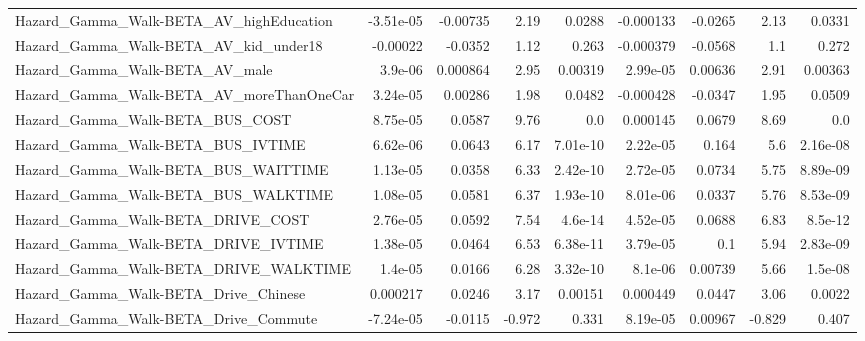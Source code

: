 \begin{tabular}{lrrrrrrrr}
Hazard\_Gamma\_Walk-BETA\_AV\_highEducation            &   -3.51e-05 &     -0.00735 &     2.19 &   0.0288 &  -0.000133 &     -0.0265 &         2.13 &        0.0331 \\
Hazard\_Gamma\_Walk-BETA\_AV\_kid\_under18              &    -0.00022 &      -0.0352 &     1.12 &    0.263 &  -0.000379 &     -0.0568 &          1.1 &         0.272 \\
Hazard\_Gamma\_Walk-BETA\_AV\_male                     &     3.9e-06 &     0.000864 &     2.95 &  0.00319 &   2.99e-05 &     0.00636 &         2.91 &       0.00363 \\
Hazard\_Gamma\_Walk-BETA\_AV\_moreThanOneCar           &    3.24e-05 &      0.00286 &     1.98 &   0.0482 &  -0.000428 &     -0.0347 &         1.95 &        0.0509 \\
Hazard\_Gamma\_Walk-BETA\_BUS\_COST                    &    8.75e-05 &       0.0587 &     9.76 &      0.0 &   0.000145 &      0.0679 &         8.69 &           0.0 \\
Hazard\_Gamma\_Walk-BETA\_BUS\_IVTIME                  &    6.62e-06 &       0.0643 &     6.17 & 7.01e-10 &   2.22e-05 &       0.164 &          5.6 &      2.16e-08 \\
Hazard\_Gamma\_Walk-BETA\_BUS\_WAITTIME                &    1.13e-05 &       0.0358 &     6.33 & 2.42e-10 &   2.72e-05 &      0.0734 &         5.75 &      8.89e-09 \\
Hazard\_Gamma\_Walk-BETA\_BUS\_WALKTIME                &    1.08e-05 &       0.0581 &     6.37 & 1.93e-10 &   8.01e-06 &      0.0337 &         5.76 &      8.53e-09 \\
Hazard\_Gamma\_Walk-BETA\_DRIVE\_COST                  &    2.76e-05 &       0.0592 &     7.54 &  4.6e-14 &   4.52e-05 &      0.0688 &         6.83 &       8.5e-12 \\
Hazard\_Gamma\_Walk-BETA\_DRIVE\_IVTIME                &    1.38e-05 &       0.0464 &     6.53 & 6.38e-11 &   3.79e-05 &         0.1 &         5.94 &      2.83e-09 \\
Hazard\_Gamma\_Walk-BETA\_DRIVE\_WALKTIME              &     1.4e-05 &       0.0166 &     6.28 & 3.32e-10 &    8.1e-06 &     0.00739 &         5.66 &       1.5e-08 \\
Hazard\_Gamma\_Walk-BETA\_Drive\_Chinese               &    0.000217 &       0.0246 &     3.17 &  0.00151 &   0.000449 &      0.0447 &         3.06 &        0.0022 \\
Hazard\_Gamma\_Walk-BETA\_Drive\_Commute               &   -7.24e-05 &      -0.0115 &   -0.972 &    0.331 &   8.19e-05 &     0.00967 &       -0.829 &         0.407 \\

\end{tabular}
